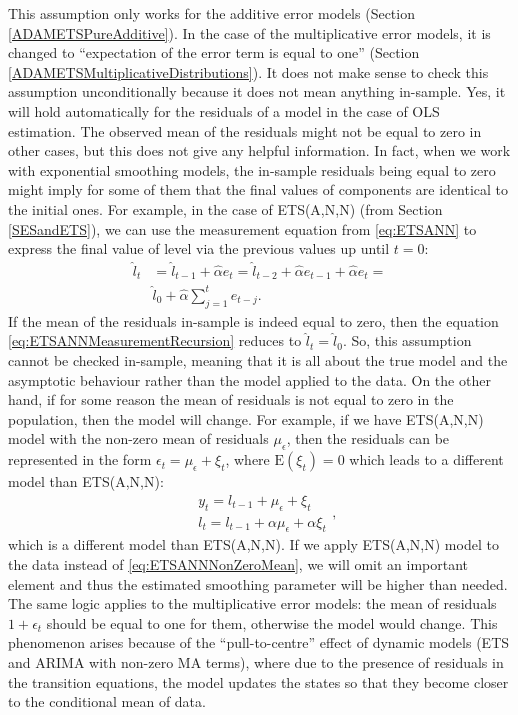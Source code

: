 \documentclass[
]{book}
\theoremstyle{definition}
\theoremstyle{definition}
\theoremstyle{definition}
\theoremstyle{definition}
\theoremstyle{remark}
\begin{document}
This assumption only works for the additive error models (Section \ref{ADAMETSPureAdditive}). In the case of the multiplicative error models, it is changed to ``expectation of the error term is equal to one'' (Section \ref{ADAMETSMultiplicativeDistributions}). It does not make sense to check this assumption unconditionally because it does not mean anything in-sample. Yes, it will hold automatically for the residuals of a model in the case of OLS estimation. The observed mean of the residuals might not be equal to zero in other cases, but this does not give any helpful information. In fact, when we work with exponential smoothing models, the in-sample residuals being equal to zero might imply for some of them that the final values of components are identical to the initial ones. For example, in the case of ETS(A,N,N) (from Section \ref{SESandETS}), we can use the measurement equation from \eqref{eq:ETSANN} to express the final value of level via the previous values up until \(t=0\):
\begin{equation}
  \begin{aligned}
    \hat{l}_t &= \hat{l}_{t-1} + \hat{\alpha} e_t = \hat{l}_{t-2} + \hat{\alpha} e_{t-1} + \hat{\alpha} e_t = \\
              & \hat{l}_0 + \hat{\alpha} \sum_{j=1}^t e_{t-j} .
  \end{aligned}
\label{eq:ETSANNMeasurementRecursion}
\end{equation}
If the mean of the residuals in-sample is indeed equal to zero, then the equation \eqref{eq:ETSANNMeasurementRecursion} reduces to \(\hat{l}_t=\hat{l}_0\). So, this assumption cannot be checked in-sample, meaning that it is all about the true model and the asymptotic behaviour rather than the model applied to the data. On the other hand, if for some reason the mean of residuals is not equal to zero in the population, then the model will change. For example, if we have ETS(A,N,N) model with the non-zero mean of residuals \(\mu_\epsilon\), then the residuals can be represented in the form \(\epsilon_t = \mu_\epsilon + \xi_t\), where \(\mathrm{E}(\xi_t)=0\) which leads to a different model than ETS(A,N,N):
\begin{equation}
  \begin{aligned}
    & y_t = l_{t-1} + \mu_\epsilon + \xi_t \\
    & l_t = l_{t-1} + \alpha \mu_\epsilon + \alpha \xi_t
  \end{aligned},
\label{eq:ETSANNNonZeroMean}
\end{equation}
which is a different model than ETS(A,N,N). If we apply ETS(A,N,N) model to the data instead of \eqref{eq:ETSANNNonZeroMean}, we will omit an important element and thus the estimated smoothing parameter will be higher than needed. The same logic applies to the multiplicative error models: the mean of residuals \(1+\epsilon_t\) should be equal to one for them, otherwise the model would change. This phenomenon arises because of the ``pull-to-centre'' effect of dynamic models (ETS and ARIMA with non-zero MA terms), where due to the presence of residuals in the transition equations, the model updates the states so that they become closer to the conditional mean of data.
\end{document}
